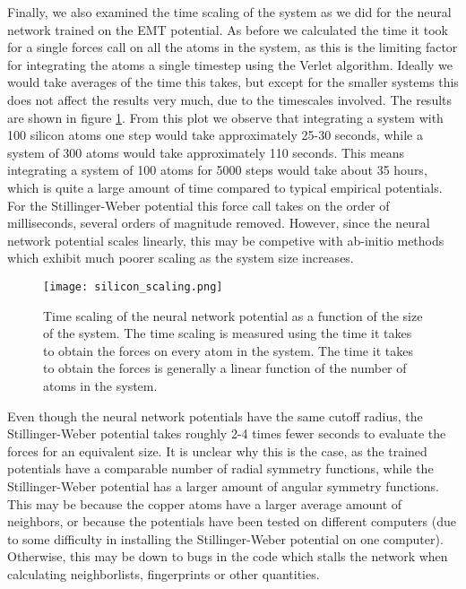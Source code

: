 Finally, we also examined the time scaling of the system as we did for the
neural network trained on the EMT potential.
As before we calculated the time it took for a single forces call
on all the atoms in the system, as this is the limiting
factor for integrating the atoms a single timestep using the
Verlet algorithm.
Ideally we would take averages of the time this takes, but except
for the smaller systems this does not affect the results very much,
due to the timescales involved.
The results are shown in figure \ref{fig:silicon-scaling}.
From this plot we observe that integrating a system
with 100 silicon atoms one step would take approximately
25-30 seconds, while a system of 300 atoms would take approximately
110 seconds. This means integrating a system of 100 atoms
for 5000 steps would take about 35 hours, which is quite
a large amount of time compared to typical empirical potentials.
For the Stillinger-Weber potential this force call
takes on the order of milliseconds, several orders of magnitude removed.
However, since the neural network potential scales linearly, this may be competive
with ab-initio methods which exhibit much poorer scaling as the system size increases.

\begin{figure}
    \centering
    \texttt{[image: silicon\_scaling.png]}
    \caption{Time scaling of the neural network potential
        as a function of the size of the system.
    The time scaling is measured using the time it takes to obtain
    the forces on every atom in the system. The time it takes to obtain
    the forces is generally a linear function of the number of atoms
    in the system.}
    \label{fig:silicon-scaling}
\end{figure}

Even though the neural network potentials have the same cutoff radius,
the Stillinger-Weber potential takes roughly 2-4 times fewer seconds to evaluate
the forces for an equivalent size. It is unclear why this is the case,
as the trained potentials have a comparable number of radial symmetry functions,
while the Stillinger-Weber potential has a larger amount of angular symmetry 
functions.
This may be because the copper atoms have a larger average amount of neighbors,
or because the potentials have been tested on different computers (due to some
    difficulty in installing the Stillinger-Weber potential on one computer).
Otherwise, this may be down to bugs in the code which stalls the network
when calculating neighborlists, fingerprints or other quantities.
